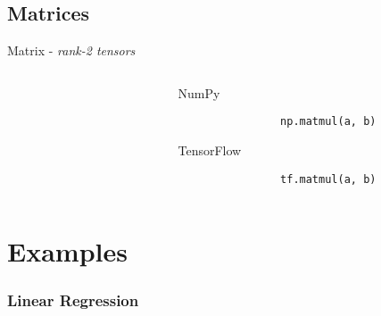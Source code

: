 \documentclass[handout]{beamer}
\begin{document}
\subsection{Matrices}
\begin{frame}[fragile]{Matrix - \textit{rank-2 tensors}}
    \begin{columns}
        \begin{column}{0.5\textwidth}
            \begin{figure}[htb]
                \centering
                \resizebox{5cm}{6cm}{
                    
                }
                \label{fig:matmul}
            \end{figure}
        \end{column}
        \begin{column}{0.5\textwidth}
            \begin{alertblock}{NumPy}
                \begin{lstlisting}
                np.matmul(a, b)
                \end{lstlisting}
            \end{alertblock}
            \begin{alertblock}{TensorFlow}
                \begin{lstlisting}
                tf.matmul(a, b)
                \end{lstlisting}
            \end{alertblock}
        \end{column}
    \end{columns}
\end{frame}

\section{Examples}

\begin{frame}[fragile]
    \frametitle{Linear Regression}
    \begin{figure}[htb]
        \centering
        
        \label{fig:regression}
	\end{figure}
\end{frame}
\end{document}
